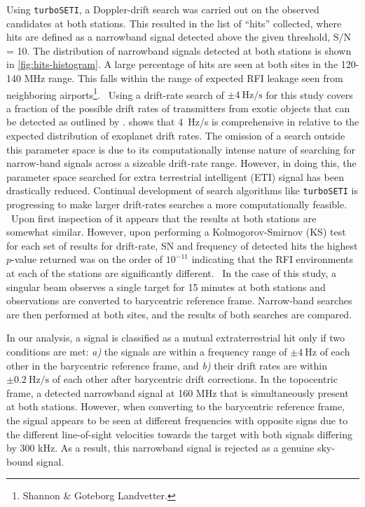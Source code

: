 Using \texttt{turboSETI}, a Doppler-drift search was carried out on the observed candidates at both stations. This resulted in the list of “hits” collected, where hits are defined as a narrowband signal detected above the given threshold, S/N = 10. The distribution of narrowband signals detected at both stations is shown in \cref{fig:hits-histogram}. A large percentage of hits are seen at both sites in the 120-140 MHz range. This falls within the range of expected RFI leakage seen from neighboring airports\footnote{Shannon \& Goteborg Landvetter.}. \ 
Using a drift-rate search of $\pm 4 \ \text{Hz/s}$ for this study covers a fraction of the possible drift rates of transmitters from exotic objects that can be detected as outlined by \cite{Sheikh_2019}. \cite{LiNarrowBand} shows that 4~Hz/s is comprehensive in relative to the expected distribution of exoplanet drift rates. The omission of a search outside this parameter space is due to its computationally intense nature of searching for narrow-band signals across a sizeable drift-rate range. However, in doing this, the parameter space searched for extra terrestrial intelligent (ETI) signal has been drastically reduced. Continual development of search algorithms like \verb|turboSETI| is progressing to make larger drift-rates searches a more computationally feasible. \
Upon first inspection of  it appears that the results at both stations are somewhat similar. However, upon performing a Kolmogorov-Smirnov (KS) test for each set of results for drift-rate, SN and frequency of detected hits the highest $p$-value returned was on the order of $10^{-11}$ indicating that the RFI environments at each of the stations are significantly different. \ 
In the case of this study, a singular beam observes a single target for 15 minutes at both stations and observations are converted to barycentric reference frame. Narrow-band searches are then performed at both sites, and the results of both searches are compared.

In our analysis, a signal is classified as a mutual extraterrestrial hit only if two conditions are met: \textit{a)} the signals are within a frequency range of $\pm 4 \ \text{Hz}$ of each other in the barycentric reference frame, and \textit{b)} their drift rates are within $\pm 0.2 \ \text{Hz/s}$ of each other after barycentric drift corrections. In the topocentric frame, a detected narrowband signal at 160 MHz that is simultaneously present at both stations. However, when converting to the barycentric reference frame, the signal appears to be seen at different frequencies with opposite signs due to the different line-of-sight velocities towards the target with both signals differing by 300 kHz. As a result, this narrowband signal is rejected as a genuine sky-bound signal.


